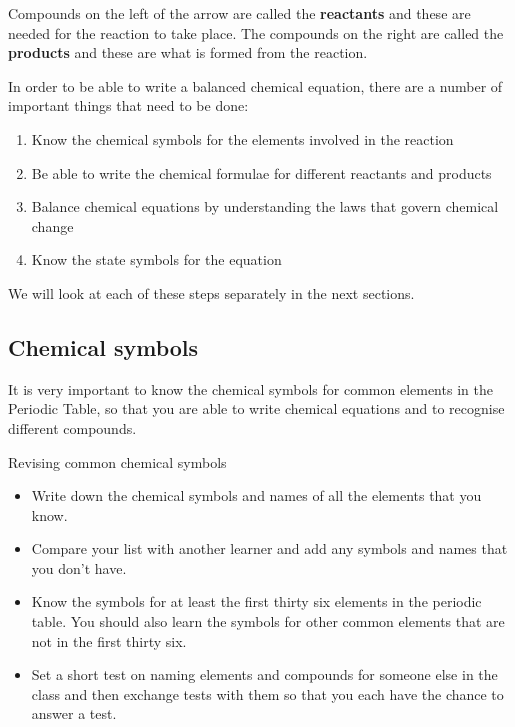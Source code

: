       \label{m38721*id62659}Compounds on the left of the arrow are called the \textbf{reactants} and these are needed for the reaction to take place. The compounds on the right are called the \textbf{products} and these are what is formed from the reaction.\par 
      \label{m38721*id62675}In order to be able to write a balanced chemical equation, there are a number of important things that need to be done:\par 
      \label{m38721*id62681}\begin{enumerate}[noitemsep, label=\textbf{\arabic*}. ] 
            \label{m38721*uid1}\item Know the chemical symbols for the elements involved in the reaction
\label{m38721*uid2}\item Be able to write the chemical formulae for different reactants and products
\label{m38721*uid3}\item Balance chemical equations by understanding the laws that govern chemical change
\label{m38721*uid4}\item Know the state symbols for the equation
\end{enumerate}
      \label{m38721*id62733}We will look at each of these steps separately in the next sections.\par 
    \label{m38721*cid2}
            \subsection*{Chemical symbols}
            \nopagebreak
      \label{m38721*id62746}It is very important to know the chemical symbols for common elements in the Periodic Table, so that you are able to write chemical equations and to recognise different compounds. 
\label{m38721*secfhsst!!!underscore!!!id109}
            \begin{activity}{Revising common chemical symbols }
            \nopagebreak
      \label{m38721*id62763}\begin{itemize}[noitemsep]
            \label{m38721*uid5}\item Write down the chemical symbols and names of all the elements that you know.
\label{m38721*uid6}\item Compare your list with another learner and add any symbols and names that you don't have.
\label{m38721*uid7}\item Know the symbols for at least the first thirty six elements in the periodic table. You should also learn the symbols for other common elements that are not in the first thirty six.
\label{m38721*uid8}\item Set a short test on naming elements and compounds for someone else in the class and then exchange tests with them so that you each have the chance to answer a test.
\end{itemize}
\end{activity}
    \label{m38721*cid3}

